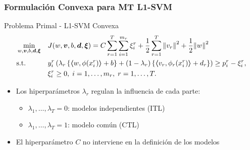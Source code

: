 \documentclass{beamer}
\newcommand{\norm}[1]{\left\lVert#1\right\rVert}
\newcommand{\myvec}[1]{\bm{#1}}
\newcommand{\fv}[1]{\myvec{#1}}
\newcommand{\dotp}[2]{\bm{\left\langle} #1, #2 \bm{\right\rangle}}
\newcommand{\ntasks}{T}
\begin{document}
  \begin{frame}
      \frametitle{Formulación Convexa para MT L1-SVM}
  
      \begin{block}{Problema Primal - L1-SVM Convexa}
            \begin{equation}\nonumber
                  \begin{aligned}
                  & \min_{w, \fv{v}, b, \fv{d}, \fv{\xi}}
                  & & {J({w}, \fv{v}, b, \fv{d}, \fv{\xi}) = C \sum_{r= 1}^T \sum_{i=1}^{m_r} {\xi_{i}^r} + \frac{1}{2} \sum_{r= 1}^T{\norm{{v}_r}^2} + \frac{1}{2} {\norm{{w}}}^2} \\
                  & \text{s.t.}
                  & & y_{i}^r \left(\lambda_r \left\lbrace \dotp{w}{\phi(x_{i}^r)} + b  \right\rbrace + (1 - \lambda_r) \left\lbrace \dotp{{v}_r}{\phi_r(x_{i}^r)} + d_r \right\rbrace  \right) \geq p_{i}^r - \xi_{i}^r ,  \\
                  & & & \xi_{i}^r \geq 0, \;  i=1 , \dotsc , m_r, \;  r= 1,\dotsc, T  . \\
                  \end{aligned}
              \end{equation}   
      \end{block}
      \begin{itemize}
            \item Los hiperparámetros $\lambda_r$ regulan la influencia de cada parte:
            \begin{itemize}
                \item $\lambda_1, \ldots, \lambda_\ntasks=0$: modelos independientes (ITL)
                \item $\lambda_1, \ldots, \lambda_\ntasks=1$: modelo común (CTL)
            \end{itemize}
            \item El hiperparámetro $C$ no interviene en la definición de los modelos
      \end{itemize}

  \end{frame}
\end{document}
